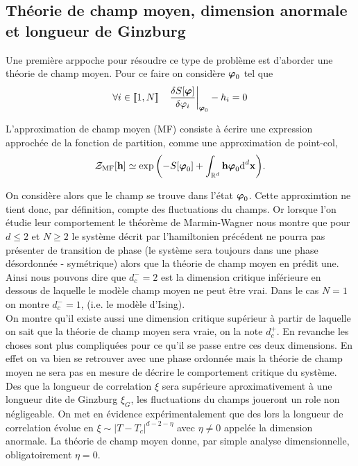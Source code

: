 \documentclass[10pt]{article}
\begin{document}
\begin{multicols}{2}
\vspace*{11pt}

\subsection{Théorie de champ moyen, dimension anormale et longueur de Ginzburg}


Une première arppoche pour résoudre ce type de problème est d'aborder une théorie de champ moyen. Pour ce faire on considère $\boldsymbol{ \varphi}_0$ tel que 
\begin{equation}
 \forall i \in  \llbracket 1,N \rrbracket  \quad  {\left. \frac{\delta S[\boldsymbol{ \varphi}]}{\delta \varphi_i} \right|}_{\boldsymbol{ \varphi}_0} - h_i = 0
\end{equation}

L'approximation de champ moyen (MF) consiste à écrire une expression approchée de la fonction de partition, comme une approximation de point-col, 
\begin{equation}
  \mathcal{Z}_{\text{MF}}[{\bf h}] \simeq \exp{\left(-S[\boldsymbol{ \varphi}_0] + \int_{\mathbb{R}^d} {\bf h}\boldsymbol{ \varphi}_0 \text{d}^d {\bf x}\right)}.
\end{equation}

On considère alors que le champ se trouve dans l'état $\boldsymbol{ \varphi}_0$. Cette approximtion ne tient donc, par définition, compte des fluctuations du champs. Or lorsque l'on étudie leur comportement le théorème de Marmin-Wagner nous montre que pour $d\le 2$ et $N \ge 2$ le système décrit par l'hamiltonien précédent ne pourra pas présenter de transition de phase (le système sera toujours dans une phase désordonnée - symétrique) alors que la théorie de champ moyen en prédit une. Ainsi nous pouvons dire que $d_c^-=2$ est la dimension critique inférieure en dessous de laquelle le modèle champ moyen ne peut être vrai. Dans le cas $N=1$ on montre $d_c^-=1$, (i.e. le modèle d'Ising). \\

On montre qu'il existe aussi une dimension critique supérieur à partir de laquelle on sait que la théorie de champ moyen sera vraie, on la note $d_c^+$. En revanche les choses sont plus compliquées pour ce qu'il se passe entre ces deux dimensions. En effet on va bien se retrouver avec une phase ordonnée mais la théorie de champ moyen ne sera pas en mesure de décrire le comportement critique du système. Des que la longueur de correlation $\xi$ sera supérieure aproximativement à une longueur dite de Ginzburg $\xi_G$, les fluctuations du champs joueront un role non négligeable. On met en évidence expérimentalement que des lors la longueur de correlation évolue en $\xi \sim |T-T_c|^{d-2-\eta}$ avec $\eta \neq 0$ appelée la dimension anormale. La théorie de champ moyen donne, par simple analyse dimensionnelle, obligatoirement $\eta = 0$. 


\end{multicols}
\end{document}

